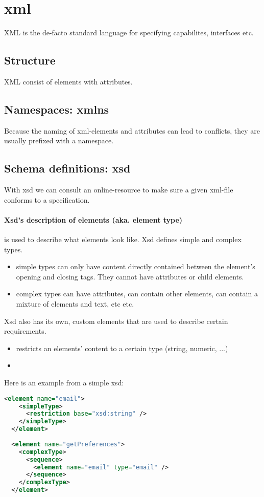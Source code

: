 \section{xml}

XML is the de-facto standard language for specifying capabilites, interfaces etc.

\subsection{Structure}
XML consist of elements with attributes.

\subsection{Namespaces: xmlns}
Because the naming of xml-elements and attributes can lead to conflicts, they are usually prefixed with a namespace. 

\subsection{Schema definitions: xsd}
With xsd we can consult an online-resource to make sure a given xml-file conforms to a specification.

\paragraph{Xsd's description of elements (aka. element type)} is used to describe what elements look like. 
Xsd defines simple and complex types. 
\begin{itemize}
    \item {} simple types can only have content directly contained between the element’s opening and closing tags. They cannot have attributes or child elements.
    \item {} complex types can have attributes, can contain other elements, can contain a mixture of elements and text, etc etc.
\end{itemize}
Xsd also has its own, custom elements that are used to describe certain requirements.
\begin{itemize}
    \item {} restricts an elements' content to a certain type (string, numeric, ...)
    \item {}
\end{itemize} 

Here is an example from a simple xsd: 
\begin{lstlisting}[language=XML]
<element name="email">
    <simpleType>
      <restriction base="xsd:string" />
    </simpleType>
  </element>
  
  <element name="getPreferences">
    <complexType>
      <sequence>
        <element name="email" type="email" />
      </sequence>
    </complexType>
  </element>
\end{lstlisting}

